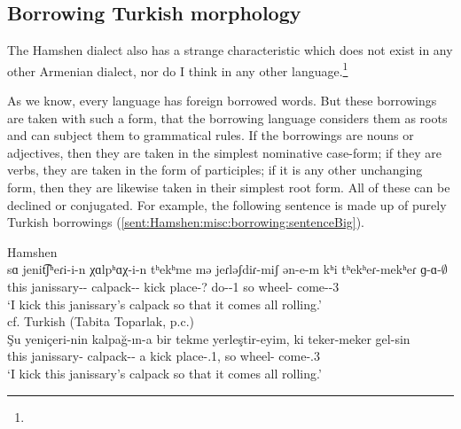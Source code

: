 \subsection{Borrowing Turkish morphology}

The Hamshen dialect also has a strange characteristic which does not exist in any other Armenian dialect, nor do I think in any other language.\footnote{}


As we know, every language has foreign borrowed words. But these borrowings are taken with such a form, that the borrowing language considers them as roots and can subject them to grammatical rules. If the borrowings are nouns or adjectives, then they are taken in the simplest nominative case-form; if they are verbs, they are taken in the form of participles; if it is any other unchanging form, then they are likewise taken in their simplest root form. All of these can be declined or conjugated. For example, the following sentence is made up of purely Turkish borrowings (\ref{sent:Hamshen:misc:borrowing:sentenceBig}). 

\begin{exe}
	\ex \begin{xlist}
		\ex Hamshen \label{sent:Hamshen:misc:borrowing:sentenceBig} \\
		\gll sɑ jenit͡ʃʰeɾi-i-n χɑlpʰɑχ-i-n tʰekʰme mə jeɾləʃdiɾ-miʃ ən-e-m kʰi tʰekʰeɾ-mekʰeɾ ɡ-ɑ-$\emptyset$ \\ 
		this janissary-{\gen}-{} calpack-{\dat}-{} kick {\indf} place-? do-{\thgloss}-1{\sg} so wheel-{\echo} come-{\thgloss}-3{\sg}\\ 
		\trans `I kick this janissary's calpack so that it comes all rolling.' \\ 
		\ex cf. Turkish (Tabita Toparlak, p.c.) \\
		\gll Şu yeniçeri-nin kalpağ-ın-a bir tekme yerleştir-eyim, ki teker-meker gel-sin \\ 
		this janissary-{\gen} calpack-{\poss}-{\dat} a kick place-{\opt}.1{\sg}, so wheel-{\echo} come-{\imp}.3{\sg} \\ 
		\trans `I kick this janissary's calpack so that it comes all rolling.' 
	\end{xlist}
\end{exe}



